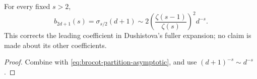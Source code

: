 \begin{corollary}
\label{thm:arithmetic-denominator-layer}
For every fixed \(s>2\),
\begin{equation}
 b_{2d+1}(s)=\sigma_{s/2}(d+1)
 \sim2\left(\frac{\zeta(s-1)}{\zeta(s)}\right)^2d^{-s}.
 \label{eq:low-temperature-local-layer}
\end{equation}
This corrects the leading coefficient in Dushistova's fuller expansion; no
claim is made about its other coefficients.
\end{corollary}

\begin{proof}
Combine  with
\eqref{eq:brocot-partition-asymptotic}, and use
\((d+1)^{-s}\sim d^{-s}\).
\end{proof}

